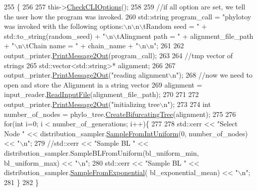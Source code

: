 \begin{DoxyCode}
255                      \{
256   
257   this->\hyperlink{classController_a1307438a1590b0deff238e4ee46aaed3}{CheckCLIOptions}();
258   
259   \textcolor{comment}{//if all option are set, we tell the user how the program was invoked.}
260   std::string program\_call = \textcolor{stringliteral}{"phylotoy was invoked with the following options:\(\backslash\)n\(\backslash\)n\(\backslash\)tRandom seed = "} + 
      std::to\_string(random\_seed) + \textcolor{stringliteral}{"\(\backslash\)n\(\backslash\)tAlingment path = "} + alignment\_file\_path + \textcolor{stringliteral}{"\(\backslash\)n\(\backslash\)tChain name = "} + chain\_name + \textcolor{stringliteral}{
      "\(\backslash\)n\(\backslash\)n"};
261   
262   output\_printer.\hyperlink{classOutputPrinter_ae9cd642df56fb6febef4cccff7ca12f2}{PrintMessage2Out}(program\_call);  
263   
264   \textcolor{comment}{//tmp vector of strings}
265   std::vector<std::string>* alignment;
266   
267   output\_printer.\hyperlink{classOutputPrinter_ae9cd642df56fb6febef4cccff7ca12f2}{PrintMessage2Out}(\textcolor{stringliteral}{"reading alignment\(\backslash\)n"});
268   \textcolor{comment}{//now we need to open and store the Alignment in a string vector}
269   alignment = input\_reader.\hyperlink{classInputReader_ad16dc3ebc228f45257b9ad4c3f62ed14}{ReadInputFile}(alignment\_file\_path);
270   
271   
272   output\_printer.\hyperlink{classOutputPrinter_ae9cd642df56fb6febef4cccff7ca12f2}{PrintMessage2Out}(\textcolor{stringliteral}{"initializing tree\(\backslash\)n"});
273   
274   \textcolor{keywordtype}{int} number\_of\_nodes = phylo\_tree.\hyperlink{classTree_a1033914891d96918380c1770a179b670}{CreateBifurcatingTree}(alignment);
275   
276   \textcolor{keywordflow}{for}(\textcolor{keywordtype}{int} i=0; i < number\_of\_generations; i++)\{
277     
278     std::cerr << \textcolor{stringliteral}{"Select Node "} << distribution\_sampler.\hyperlink{classDistributionSampler_a9b8f106eeb87f623ab457bd67ea7bfac}{SampleFromIntUniform}(0,
      number\_of\_nodes) << \textcolor{stringliteral}{"\(\backslash\)n"};
279     \textcolor{comment}{//std::cerr << "Sample BL  " << distribution\_sampler.SampleBLFromUniform(bl\_uniform\_min,
       bl\_uniform\_max) << "\(\backslash\)n";}
280     std::cerr << \textcolor{stringliteral}{"Sample BL  "} << distribution\_sampler.\hyperlink{classDistributionSampler_a05dfeef7e98478c472fe40a4526fb45a}{SampleFromExponential}(
      bl\_exponential\_mean) << \textcolor{stringliteral}{"\(\backslash\)n"};
281   \}
282 \}
\end{DoxyCode}
\mbox{\label{classController_a67b2357dbc00faba0f6557f3660e8711}} 
